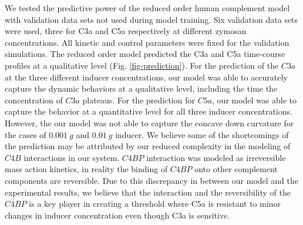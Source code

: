\documentclass[12pt]{article}
\begin{document}
We tested the predictive power of the reduced order human complement model with validation data sets not used during model training. Six validation data sets were used, three for C3a and C5a respectively at different zymosan concentrations. All kinetic and control parameters were
fixed for the validation simulations. The reduced order model predicted the C3a and C5a time-course profiles at a qualitative level (Fig. \ref{fig-prediction}). For the prediction of the $C3a$ at the three different inducer concentrations, our model was able to accurately capture the dynamic behaviors at a qualitative level, including the time the concentration of $C3a$ plateaus. For the prediction for $C5a$, our model was able to capture the behavior at a quantitative level for all three inducer concentrations. However, the our model was not able to capture the concave down curvature for the cases of $0.001~g$ and $0.01~g$ inducer. We believe some of the shortcomings of the prediction may be attributed by our reduced complexity in the modeling of $C4B$ interactions in our system. $C4BP$ interaction was modeled as irreversible mass action kinetics, in reality the binding of $C4BP$ onto other complement components are reversible. Due to this discrepancy in between our model and the experimental results, we believe that the interaction and the reversibility of the $C4BP$ is a key player in creating a threshold where C5a is resistant to minor changes in inducer concentration even though C3a is sensitive. 

\end{document}
